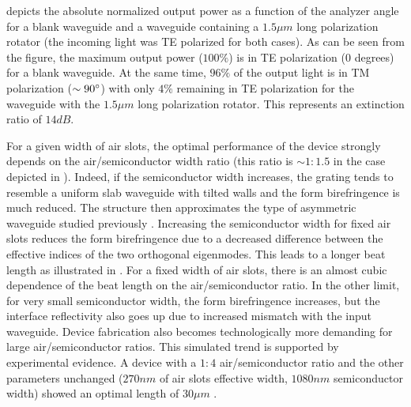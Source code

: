 depicts the absolute normalized output
power as a function of the analyzer angle for a blank waveguide and a
waveguide containing a $1.5 \mu m$ long polarization rotator (the
incoming light was TE polarized for both cases). As can be seen from
the figure, the maximum output power ($100\%$) is in TE polarization
($0$ degrees) for a blank waveguide. At the same time, $96\%$ of the
output light is in TM polarization ($\sim 90^\circ$) with only $4\%$
remaining in TE polarization for the waveguide with the $1.5 \mu m$
long polarization rotator. This represents an extinction ratio of $14
dB$.

For a given width of air slots, the optimal performance of the device
strongly depends on the air/semiconductor width ratio (this ratio is
$\sim 1:1.5$ in the case depicted in
). Indeed, if the semiconductor width
increases, the grating tends to resemble a uniform slab waveguide with
tilted walls and the form birefringence is much reduced. The structure
then approximates the type of asymmetric waveguide studied previously
\cite{taillaert_compact}. Increasing the semiconductor width for fixed
air slots reduces the form birefringence due to a decreased difference
between the effective indices of the two orthogonal eigenmodes. This
leads to a longer beat length as illustrated in
. For a fixed width of air slots, there
is an almost cubic dependence of the beat length on the
air/semiconductor ratio. In the other limit, for very small
semiconductor width, the form birefringence increases, but the
interface reflectivity also goes up due to increased mismatch with the
input waveguide. Device fabrication also becomes technologically more
demanding for large air/semiconductor ratios. This simulated trend is
supported by experimental evidence. A device with a $1:4$
air/semiconductor ratio and the other parameters unchanged ($270 nm$
of air slots effective width, $1080 nm$ semiconductor width) showed an
optimal length of $30 \mu m$ .

